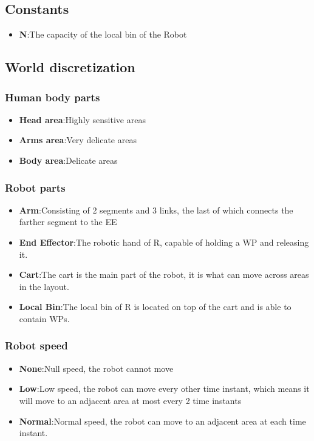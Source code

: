 \documentclass[a4paper]{article}
\begin{document}
\subsection{Constants}
\begin{itemize}
    \item \textbf{N}:\@ The capacity of the local bin of the Robot
\end{itemize}
\subsection{World discretization}

\subsubsection{Human body parts}
\begin{itemize}
    \item \textbf{Head area}:\@ Highly sensitive areas
    \item \textbf{Arms area}:\@ Very delicate areas
    \item \textbf{Body area}:\@ Delicate areas
\end{itemize}

\subsubsection{Robot parts}
\begin{itemize}
    \item \textbf{Arm}:\@ Consisting of 2 segments and 3 links, the last of which connects the farther segment to the EE
    \item \textbf{End Effector}:\@ The robotic hand of R, capable of holding a WP and releasing it.
    \item \textbf{Cart}:\@ The cart is the main part of the robot, it is what can move across areas in the layout.
    \item \textbf{Local Bin}:\@ The local bin of R is located on top of the cart and is able to contain WPs.
\end{itemize}

\subsubsection{Robot speed}
\begin{itemize}
    \item \textbf{None}:\@ Null speed, the robot cannot move
    \item \textbf{Low}:\@ Low speed, the robot can move every other time instant, which means it will move to an adjacent area at most every 2 time instants
    \item \textbf{Normal}:\@ Normal speed, the robot can move to an adjacent area at each time instant.
\end{itemize}
\end{document}
